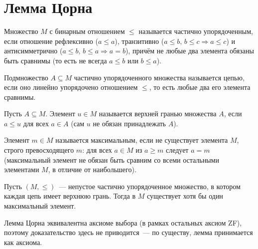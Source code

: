 \documentclass[12pt]{article}
\begin{document}
    \section{Лемма Цорна}
    
    \begin{definition}
    	Множество $M$ с бинарным отношением $\leqslant$ называется частично упорядоченным, если отношение рефлексивно ($a \leqslant a$), транзитивно ($a \leqslant b,\, b \leqslant c \Rightarrow a \leqslant c$) и антисимметрично ($a \leqslant b,\, b \leqslant a \Rightarrow a = b$), причём не любые два элемента обязаны быть сравнимы (то есть не всегда $a \leqslant b$ или $b \leqslant a$).
    \end{definition}
    
    \begin{definition}[Цепь]
    	Подмножество $A \subseteq M$ частично упорядоченного множества называется цепью, если оно линейно упорядочено отношением $\leqslant$, то есть любые два его элемента сравнимы.
    \end{definition}
    
    \begin{definition}
    	Пусть $A \subseteq M$. Элемент $u \in M$ называется верхней гранью множества $A$, если $a \leqslant u$ для всех $a \in A$ (сам $u$ не обязан принадлежать $A$).
    \end{definition}
    
    \begin{definition}
    	Элемент $m \in M$ называется максимальным, если не существует элемента $M$, строго превосходящего $m$: для всех $a \in M$ из $a \geqslant m$ следует $a = m$ (максимальный элемент не обязан быть сравним со всеми остальными элементами $M$, в отличие от наибольшего).
    \end{definition}
    
    \begin{lemma}[Цорна]
    	Пусть $(M, \leqslant)$~--- непустое частично упорядоченное множество, в котором каждая цепь имеет верхнюю грань. Тогда в $M$ существует хотя бы один максимальный элемент.
    \end{lemma}
    
    \begin{note}
    	Лемма Цорна эквивалентна аксиоме выбора (в рамках остальных аксиом ZF), поэтому доказательство здесь не приводится~--- по существу, лемма принимается как аксиома.
    \end{note}
    
\end{document}
